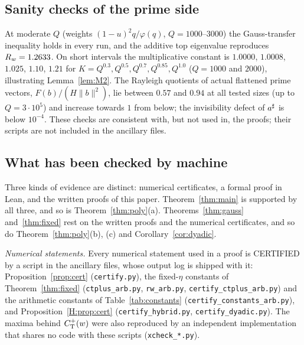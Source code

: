 \documentclass[11pt]{amsart}
\theoremstyle{definition}
\theoremstyle{remark}
\numberwithin{equation}{section}
\begin{document}
\subsection{Sanity checks of the prime side}
At moderate $Q$ (weights $(1-u)^2q/\varphi(q)$, $Q=1000$--$3000$) the Gauss-transfer inequality holds in every run, and the additive top eigenvalue reproduces $R_w=1.2633$. On short intervals the multiplicative constant is $1.0000$, $1.0008$, $1.025$, $1.10$, $1.21$ for $K=Q^{0.3},Q^{0.5},Q^{0.7},Q^{0.85},Q^{1.0}$ ($Q=1000$ and $2000$), illustrating Lemma~\ref{lem:M2}. The Rayleigh quotients of actual flattened prime vectors, $F(b)/(H\|b\|^2)$, lie between $0.57$ and $0.94$ at all tested sizes (up to $Q=3\cdot10^5$) and increase towards $1$ from below; the invisibility defect of $a^{\sharp}$ is below $10^{-4}$. These checks are consistent with, but not used in, the proofs; their scripts are not included in the ancillary files.

\subsection{What has been checked by machine}\label{ssec:checked}
Three kinds of evidence are distinct: numerical certificates, a formal proof in Lean, and the written proofs of this paper. Theorem~\ref{thm:main} is supported by all three, and so is Theorem~\ref{thm:poly}(a). Theorems~\ref{thm:gauss} and~\ref{thm:fixed} rest on the written proofs and the numerical certificates, and so do Theorem~\ref{thm:poly}(b), (c) and Corollary~\ref{cor:dyadic}.

\emph{Numerical statements.} Every numerical statement used in a proof is CERTIFIED by a script in the ancillary files, whose output log is shipped with it: Proposition~\ref{prop:cert} (\texttt{certify.py}), the fixed-$\eta$ constants of Theorem~\ref{thm:fixed} (\texttt{ctplus\_arb.py}, \texttt{rw\_arb.py}, \texttt{certify\_ctplus\_arb.py}) and the arithmetic constants of Table~\ref{tab:constants} (\texttt{certify\_constants\_arb.py}), and Proposition~\ref{H:prop:cert} (\texttt{certify\_hybrid.py}, \texttt{certify\_dyadic.py}). The maxima behind $C^{+}_{\mathrm T}(w)$ were also reproduced by an independent implementation that shares no code with these scripts (\texttt{xcheck\_*.py}).
\end{document}
